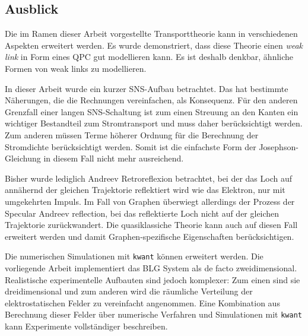 \subsection*{Ausblick}
Die im Ramen dieser Arbeit vorgestellte Transporttheorie kann in verschiedenen Aspekten erweitert werden. Es wurde demonstriert, dass diese Theorie einen \emph{weak link} in Form eines QPC gut modellieren kann. Es ist deshalb denkbar, \"ahnliche Formen von weak links zu modellieren.

In dieser Arbeit wurde ein kurzer SNS-Aufbau betrachtet. Das hat bestimmte N\"aherungen, die die Rechnungen vereinfachen, als Konsequenz.  F\"ur den anderen Grenzfall einer langen SNS-Schaltung ist zum einen Streuung an den Kanten ein wichtiger Bestandteil zum Stromtransport und muss daher ber\"ucksichtigt werden. Zum anderen m\"ussen Terme h\"oherer Ordnung f\"ur die Berechnung der Stromdichte ber\"ucksichtigt werden. Somit ist die einfachste Form der Josephson-Gleichung in diesem Fall nicht mehr ausreichend. 

Bisher wurde lediglich Andreev Retroreflexion betrachtet, bei der das Loch auf ann\"ahernd der gleichen Trajektorie reflektiert wird wie das Elektron, nur mit umgekehrten Impuls. Im Fall von Graphen \"uberwiegt allerdings der Prozess der Specular Andreev reflection, bei das reflektierte Loch nicht auf der gleichen Trajektorie zur\"uckwandert. Die quasiklassiche Theorie kann auch auf diesen Fall erweitert werden und damit Graphen-spezifische Eigenschaften ber\"ucksichtigen.

Die numerischen Simulationen mit \texttt{kwant} k\"onnen erweitert werden. Die vorliegende Arbeit implementiert das BLG System als de facto zweidimensional. Realistische experimentelle Aufbauten sind jedoch komplexer: Zum einen sind sie dreidimensional und zum anderen wird die r\"aumliche Verteilung der elektrostatischen Felder zu vereinfacht angenommen. Eine Kombination aus Berechnung dieser Felder \"uber numerische Verfahren und Simulationen mit \texttt{kwant} kann Experimente vollst\"andiger beschreiben. 


% 





